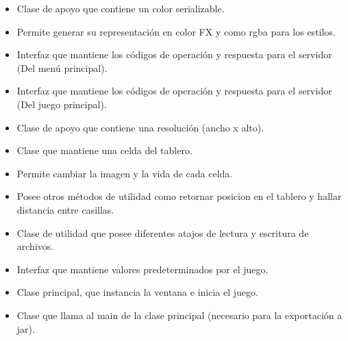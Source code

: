 \documentclass{article}
\begin{document}
\begin{itemize}
	\item Clase de apoyo que contiene un color serializable.
	\item Permite generar su representación en color FX y como rgba para los estilos.
\end{itemize}

\begin{itemize}
	\item Interfaz que mantiene los códigos de operación y respuesta para el servidor (Del menú principal).
\end{itemize}

\begin{itemize}
	\item Interfaz que mantiene los códigos de operación y respuesta para el servidor (Del juego principal).
\end{itemize}

\begin{itemize}
	\item Clase de apoyo que contiene una resolución (ancho x alto).
\end{itemize}

\begin{itemize}
	\item Clase que mantiene una celda del tablero.
	\item Permite cambiar la imagen y la vida de cada celda.
	\item Posee otros métodos de utilidad como retornar posicion en el tablero y hallar distancia entre casillas.
\end{itemize}

\begin{itemize}
	\item Clase de utilidad que posee diferentes atajos de lectura y escritura de archivos.
\end{itemize}

\begin{itemize}
	\item Interfaz que mantiene valores predeterminados por el juego.
\end{itemize}

\begin{itemize}
	\item Clase principal, que instancia la ventana e inicia el juego.
\end{itemize}

\begin{itemize}
	\item Clase que llama al main de la clase principal (necesario para la exportación a jar).
\end{itemize}
\pagebreak
\end{document}
